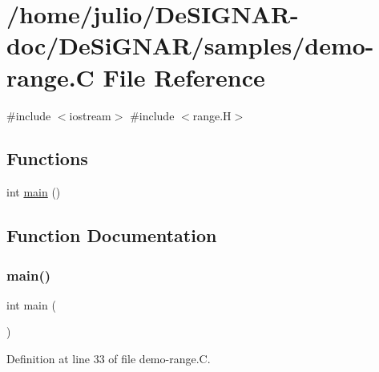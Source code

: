 \hypertarget{demo-range_8_c}{}\section{/home/julio/\+De\+S\+I\+G\+N\+A\+R-\/doc/\+De\+Si\+G\+N\+A\+R/samples/demo-\/range.C File Reference}
\label{demo-range_8_c}
{\ttfamily \#include $<$iostream$>$}\newline
{\ttfamily \#include $<$range.\+H$>$}\newline
\subsection*{Functions}
\begin{DoxyCompactItemize}
\item 
int \hyperlink{demo-range_8_c_ae66f6b31b5ad750f1fe042a706a4e3d4}{main} ()
\end{DoxyCompactItemize}


\subsection{Function Documentation}
\mbox{\label{demo-range_8_c_ae66f6b31b5ad750f1fe042a706a4e3d4}} 
\subsubsection{\texorpdfstring{main()}{main()}}
{\footnotesize\ttfamily int main (\begin{DoxyParamCaption}{ }\end{DoxyParamCaption})}



Definition at line 33 of file demo-\/range.\+C.

